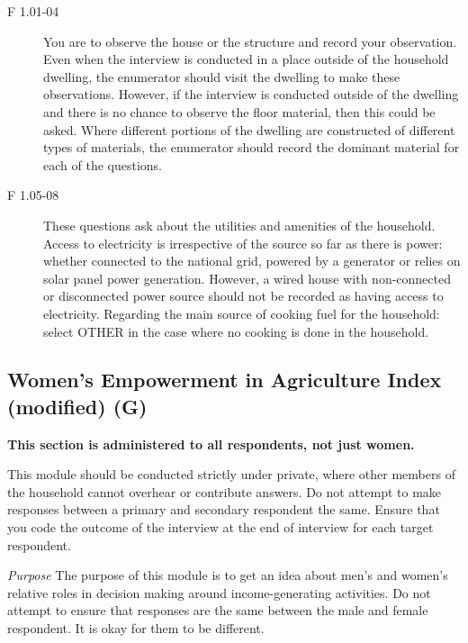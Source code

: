 \documentclass[a4paper]{refart}
\begin{document}
\begin{description}
\item[F 1.01-04] You are to observe the house or the structure and record your observation. Even when the interview is conducted in a place outside of the household dwelling, the enumerator should visit the dwelling to make these observations. However, if the interview is conducted outside of the dwelling and there is no chance to observe the floor material, then this could be asked. Where different portions of the dwelling are constructed of different types of materials, the enumerator should record the dominant material for each of the questions.
\item[F 1.05-08] These questions ask about the utilities and amenities of the household. Access to electricity is irrespective of the source so far as there is power: whether connected to the national grid, powered by a generator or relies on solar panel power generation. However, a wired house with non-connected or disconnected power source should not be recorded as having access to electricity. Regarding the main source of cooking fuel for the household: select OTHER in the case where no cooking is done in the household.
\end{description}

\subsection{Women's Empowerment in Agriculture Index (modified) (G)}
\textbf{This section is administered to all respondents, not just women.}

This module should be conducted strictly under private, where other members of the household cannot overhear or contribute answers. Do not attempt to make responses between a primary and secondary respondent the same. Ensure that you code the outcome of the interview at the end of interview for each target respondent.


\textit{Purpose}
The purpose of this module is to get an idea about men’s and women’s relative roles in decision making around income-generating activities. Do not attempt to ensure that responses are the same between the male and female respondent. It is okay for them to be different.
\end{document}

